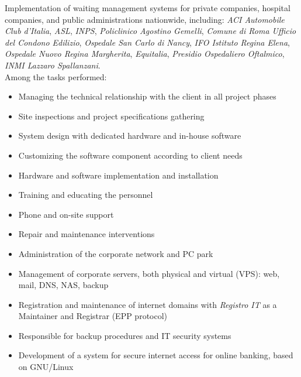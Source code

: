\vspace{3mm}
        {Implementation of waiting management systems for private companies, hospital companies, and public administrations nationwide, including: \emph{ACI Automobile Club d'Italia}, \emph{ASL}, \emph{INPS}, \emph{Policlinico Agostino Gemelli}, \emph{Comune di Roma Ufficio del Condono Edilizio}, \emph{Ospedale San Carlo di Nancy}, \emph{IFO Istituto Regina Elena}, \emph{Ospedale Nuovo Regina Margherita}, \emph{Equitalia}, \emph{Presidio Ospedaliero Oftalmico}, \emph{INMI Lazzaro Spallanzani}.\\ Among the tasks performed:
          \begin{itemize}
          \item Managing the technical relationship with the client in all project phases
          \item Site inspections and project specifications gathering
          \item System design with dedicated hardware and in-house software
          \item Customizing the software component according to client needs
          \item Hardware and software implementation and installation
          \item Training and educating the personnel
          \item Phone and on-site support
          \item Repair and maintenance interventions
          \end{itemize}}
\vspace{3mm}
        {\begin{itemize}
          \item Administration of the corporate network and PC park
          \item Management of corporate servers, both physical and virtual (VPS): web, mail, DNS, NAS, backup
          \item Registration and maintenance of internet domains with \emph{Registro IT} as a Maintainer and Registrar (EPP protocol)
          \item Responsible for backup procedures and IT security systems
          \item Development of a system for secure internet access for online banking, based on GNU/Linux
        \end{itemize}}
